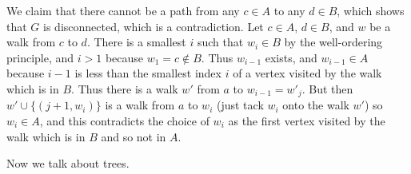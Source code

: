 \documentclass[12pt]{article}
\begin{document}
\begin{description}
We claim that there cannot be a path from any $c \in A$ to any $d \in B$, which shows that $G$ is disconnected, which is a contradiction.  Let $c \in A$, $d \in B$, and $w$ be a walk from $c$ to $d$.  There is a smallest $i$ such
that $w_i \in B$ by the well-ordering principle, and $i>1$ because $w_1 = c \not\in B$.  Thus $w_{i-1}$ exists,
and $w_{i-1} \in A$ because $i-1$ is less than the smallest index $i$ of a vertex visited by the walk which is in $B$.
Thus there is a walk $w'$ from $a$ to $w_{i-1} = w'_j$.  But then $w' \cup \{(j+1,w_i)\}$ is a walk from $a$ to $w_i$
(just tack $w_i$ onto the walk $w'$) so $w_i \in A$, and this contradicts the choice of $w_i$ as the first vertex visited by the walk which is in $B$ and so not in $A$.

\end{description}

Now we talk about trees.
\end{document}
